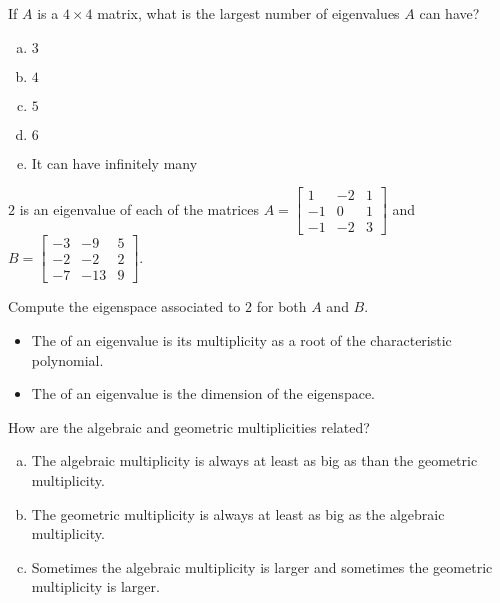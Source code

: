 
\begin{applicationActivities}{4}{28}

\begin{activity}{5}
  If $A$ is a $4 \times 4$ matrix, what is the largest number of eigenvalues $A$ can have?
  \begin{enumerate}[(a)]
  \item $3$
  \item $4$
  \item $5$
  \item $6$
  \item It can have infinitely many
  \end{enumerate}
\end{activity}

\begin{activity}{10}
  $2$ is an eigenvalue of each of the matrices $A=\begin{bmatrix} 1 & -2 & 1 \\ -1 & 0 & 1 \\ -1 & -2 & 3\end{bmatrix}$ and $B=\begin{bmatrix} -3 & -9 & 5 \\ -2 & -2 & 2 \\ -7 & -13 & 9 \end{bmatrix}$.

  Compute the eigenspace associated to $2$ for both $A$ and $B$.
\end{activity}

\begin{definition}

\begin{itemize}
\item The  of an eigenvalue is its multiplicity as a root of the characteristic polynomial.
\item The  of an eigenvalue is the dimension of the eigenspace.
\end{itemize}

\end{definition}

\begin{activity}{10} How are the algebraic and geometric multiplicities related?
\begin{enumerate}[(a)]
\item The algebraic multiplicity is always at least as big as than the geometric multiplicity.
\item The geometric multiplicity is always at least as big as the algebraic multiplicity.
\item Sometimes the algebraic multiplicity is larger and sometimes the geometric multiplicity is larger.
\end{enumerate}
\end{activity}


\end{applicationActivities}
